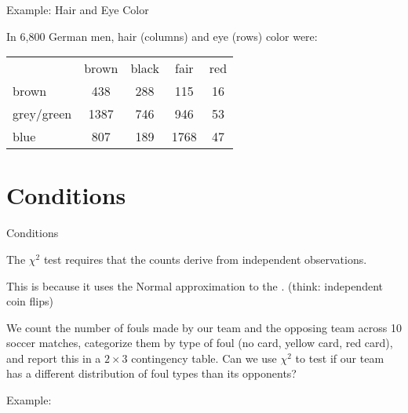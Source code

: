 \begin{frame}{Example: Hair and Eye Color}

    In 6,800 German men, hair (columns) and eye (rows) color were:
        \begin{center}
            \begin{tabular}{lccc|c}
                & brown & black & fair & red \\
                brown & 438 & 288 & 115 & 16 \\
                grey/green & 1387 & 746 & 946 & 53 \\
                blue & 807 & 189 & 1768 & 47 \\
            \end{tabular}
        \end{center}

\end{frame}

\section{Conditions}

\begin{frame}{Conditions}

    The $\chi^2$ test requires that the counts derive from \alert{independent observations}.

    \vspace{2em}

    This is because it uses the Normal approximation to the .
    (think: independent coin flips)


    \vspace{2em}

    We count the number of fouls made by our team and the opposing team across 10 soccer matches,
    categorize them by type of foul (no card, yellow card, red card),
    and report this in a $2\times 3$ contingency table.
    Can we use $\chi^2$ to test if our team has a different distribution of foul types than its opponents?

\end{frame}


\begin{frame}{Example:}

    \begin{center}
    \end{center}


\end{frame}


